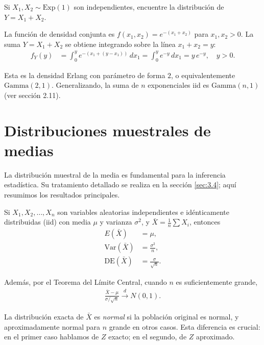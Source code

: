 \begin{ejemplo}
 \label{exmp:3.2.5}
Si $X_1, X_2 \sim \text{Exp}(1)$ son independientes, encuentre la distribuci\'on de
$Y = X_1 + X_2$.
\end{ejemplo}

\begin{solucion}
La funci\'on de densidad conjunta es $f(x_1, x_2) = e^{-(x_1+x_2)}$ para
$x_1, x_2 > 0$. La suma $Y = X_1 + X_2$ se obtiene integrando sobre la l\'inea
$x_1 + x_2 = y$:
\begin{align}
 f_Y(y) &= \int_0^y e^{-(x_1 + (y-x_1))}\,dx_1 = \int_0^y e^{-y}\,dx_1 = y\,e^{-y}, \quad y > 0.
\end{align}

Esta es la densidad Erlang con par\'ametro de forma $2$, o equivalentemente
$\text{Gamma}(2, 1)$. Generalizando, la suma de $n$ exponenciales iid es
$\text{Gamma}(n, 1)$ (ver secci\'on 2.11).
\end{solucion}



\section{Distribuciones muestrales de medias}

La distribuci\'on muestral de la media es fundamental para la inferencia estad\'istica.
Su tratamiento detallado se realiza en la secci\'on \ref{sec:3.4}; aqu\'i resumimos
los resultados principales.

Si $X_1, X_2, \ldots, X_n$ son variables aleatorias independientes e id\'enticamente
distribuidas (iid) con media $\mu$ y varianza $\sigma^2$, y $\bar{X} = \frac{1}{n}\sum X_i$,
entonces
\begin{align}
 \label{eq:3.2.7}
 E(\bar{X}) &= \mu, \\
 \label{eq:3.2.8}
 \text{Var}(\bar{X}) &= \frac{\sigma^2}{n}, \\
 \label{eq:3.2.9}
 \text{DE}(\bar{X}) &= \frac{\sigma}{\sqrt{n}}.
\end{align}

Adem\'as, por el Teorema del L\'imite Central, cuando $n$ es suficientemente grande,
\begin{align}
 \label{eq:3.2.10}
 \frac{\bar{X} - \mu}{\sigma/\sqrt{n}} \xrightarrow{d} N(0,1).
\end{align}

\begin{observacion}
La distribuci\'on exacta de $\bar{X}$ es \emph{normal} si la poblaci\'on original es
normal, y aproximadamente normal para $n$ grande en otros casos. Esta diferencia es
crucial: en el primer caso hablamos de $Z$ exacto; en el segundo, de $Z$ aproximado.
\end{observacion}



